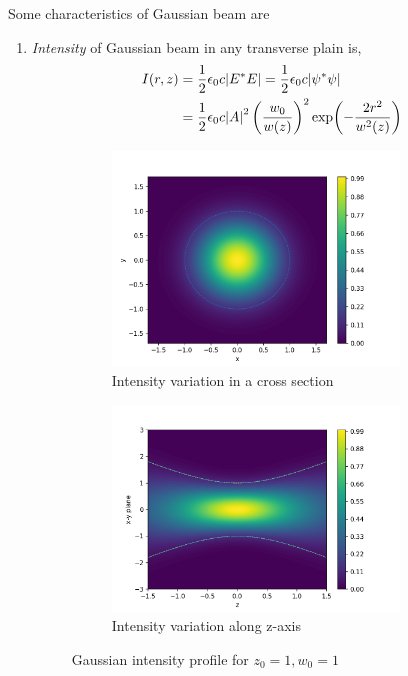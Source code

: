 \documentclass[11pt,a4paper]{article}
\numberwithin{equation}{section}
\begin{document}
Some characteristics of Gaussian beam are
\begin{enumerate}
	\item 
	\textit{Intensity} of Gaussian beam in any transverse plain is, 
	\begin{align}
		I(r,z)&= \frac{1}{2}\epsilon_0c\abs{E^\ast E} = \frac{1}{2}\epsilon_0c\abs{\psi^\ast \psi}\nonumber\\
		&= \frac{1}{2} \epsilon_0c \abs{A}^2 \left(\frac{w_0}{w(z)}\right)^2  \exp(-\frac{2r^2}{w^2(z)})
	\end{align}
	\begin{figure}[H]
		\begin{subfigure}[H]{0.49\textwidth}
			\centering
			\includegraphics[width=0.9\textwidth]{intensity.png}
			\caption{Intensity variation in a cross section}
			\label{fig:g intensity}
		\end{subfigure}
		\hfill
		\begin{subfigure}[H]{0.49\textwidth}
			\centering
			\includegraphics[width=0.9\textwidth]{intensity_var.png}
			\caption{Intensity variation along z-axis}
			\label{fig:g intensity var}
		\end{subfigure}
		\caption{Gaussian intensity profile for $z_0=1,w_0=1$}
	\end{figure}
	

\end{enumerate}
\end{document}
